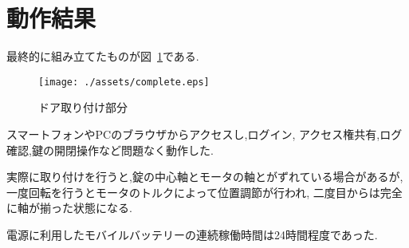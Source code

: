 \section{動作結果}\label{sec:result}
最終的に組み立てたものが図~\ref{fig:complete}である.

\begin{figure}[htbp]
  \centering
  \texttt{[image: ./assets/complete.eps]}
  \caption{ドア取り付け部分}
  \label{fig:complete}
\end{figure}

スマートフォンやPCのブラウザからアクセスし,ログイン,
アクセス権共有,ログ確認,鍵の開閉操作など問題なく動作した.

実際に取り付けを行うと,錠の中心軸とモータの軸とがずれている場合があるが,
一度回転を行うとモータのトルクによって位置調節が行われ,
二度目からは完全に軸が揃った状態になる.

電源に利用したモバイルバッテリーの連続稼働時間は24時間程度であった.

